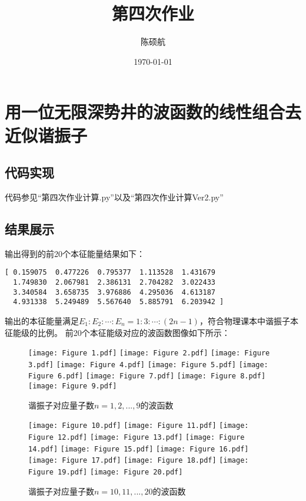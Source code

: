 \documentclass[12pt, openany]{article}
\author{陈硕航}
\date{\today}
\title{第四次作业}
\begin{document}
	\maketitle
	\section{用一位无限深势井的波函数的线性组合去近似谐振子}
	\subsection{代码实现}
	代码参见“第四次作业计算.py”以及“第四次作业计算Ver2.py”
	\subsection{结果展示}
	输出得到的前20个本征能量结果如下：
	\begin{lstlisting}
[ 0.159075  0.477226  0.795377  1.113528  1.431679 
  1.749830  2.067981  2.386131  2.704282  3.022433
  3.340584  3.658735  3.976886  4.295036  4.613187
  4.931338  5.249489  5.567640  5.885791  6.203942 ]
	\end{lstlisting}
	输出的本征能量满足$E_1:E_2: \cdots : E_n=1:3: \cdots :(2n-1)$，符合物理课本中谐振子本征能级的比例。
	前20个本征能级对应的波函数图像如下所示：
	\begin{figure}[!htb]
		\centering
		\texttt{[image: Figure 1.pdf]}
		\texttt{[image: Figure 2.pdf]}
		\texttt{[image: Figure 3.pdf]}
		\texttt{[image: Figure 4.pdf]}
		\texttt{[image: Figure 5.pdf]}
		\texttt{[image: Figure 6.pdf]}
		\texttt{[image: Figure 7.pdf]}
		\texttt{[image: Figure 8.pdf]}
		\texttt{[image: Figure 9.pdf]}
		\caption{谐振子对应量子数$n = 1,2,...,9$的波函数}
	\end{figure}
	\begin{figure}[!htb]
		\centering
		\texttt{[image: Figure 10.pdf]}
		\texttt{[image: Figure 11.pdf]}
		\texttt{[image: Figure 12.pdf]}
		\texttt{[image: Figure 13.pdf]}
		\texttt{[image: Figure 14.pdf]}
		\texttt{[image: Figure 15.pdf]}
		\texttt{[image: Figure 16.pdf]}
		\texttt{[image: Figure 17.pdf]}
		\texttt{[image: Figure 18.pdf]}
		\texttt{[image: Figure 19.pdf]}
		\texttt{[image: Figure 20.pdf]}
		\caption{谐振子对应量子数$n = 10,11,...,20$的波函数}
	\end{figure}
	\newpage
\end{document}
